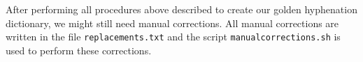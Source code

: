 \documentclass{article}
\begin{document}


%
%



After performing all procedures above described to create our golden hyphenation
dictionary, we might still need manual corrections.
All manual corrections are written in the file \texttt{replacements.txt} and
the script \texttt{manualcorrections.sh} is used to perform these corrections.
\end{document}
